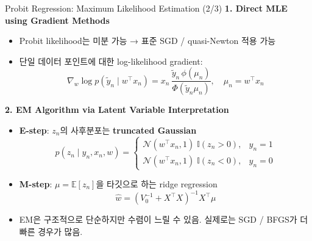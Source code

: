 \documentclass[xcolor=dvipsnames,t,9pt]{beamer}
\begin{document}
\begin{frame}{Probit Regression: Maximum Likelihood Estimation (2/3)}
    \textbf{1. Direct MLE using Gradient Methods}
    \begin{itemize}
        \item Probit likelihood는 미분 가능 → 표준 SGD / quasi-Newton 적용 가능
        \item 단일 데이터 포인트에 대한 log-likelihood gradient:
        \[
        \nabla_w \log p(\tilde{y}_n \mid w^\top x_n)
        = x_n \, \frac{\tilde{y}_n \, \phi(\mu_n)}{\Phi(\tilde{y}_n \mu_n)},
        \quad \mu_n = w^\top x_n
        \]
    \end{itemize}
\vfill
    \textbf{2. EM Algorithm via Latent Variable Interpretation}
    \begin{itemize}
        \item \textbf{E-step}: $z_n$의 사후분포는 \textbf{truncated Gaussian}
        \[
        p(z_n \mid y_n, x_n, w)
        =
        \begin{cases}
        \mathcal{N}(w^\top x_n, 1)\; \mathbb{I}(z_n>0), & y_n=1 \\
        \mathcal{N}(w^\top x_n, 1)\; \mathbb{I}(z_n<0), & y_n=0
        \end{cases}
        \]
        \item \textbf{M-step}: $\mu = \mathbb{E}[z_n]$을 타깃으로 하는 ridge regression
        \[
        \hat{w}=\left(V_0^{-1}+X^{\top}X\right)^{-1}X^{\top}\mu
        \]
        \item EM은 구조적으로 단순하지만 수렴이 느릴 수 있음. 실제로는 SGD / BFGS가 더 빠른 경우가 많음.
    \end{itemize}
\end{frame}

\end{document}
